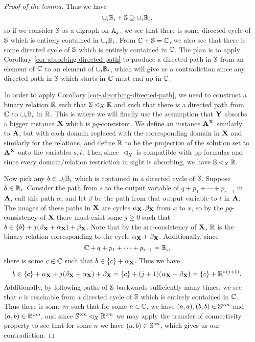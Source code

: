 \documentclass[letterpaper,11pt]{article}
\begin{document}
\begin{proof}[Proof of the lemma]
Thus we have
\[
\cup_i \mathbb{B}_i + \mathbb{S} \supseteq \cup_i\mathbb{B}_i,
\]
so if we consider $\mathbb{S}$ as a digraph on $\mathbb{A}_x$, we see that there is some directed cycle of $\mathbb{S}$ which is entirely contained in $\cup_i \mathbb{B}_i$. From $\mathbb{C} + \mathbb{S} = \mathbb{C}$, we also see that there is some directed cycle of $\mathbb{S}$ which is entirely contained in $\mathbb{C}$. The plan is to apply Corollary \ref{cor-absorbing-directed-path} to produce a directed path in $\mathbb{S}$ from an element of $\mathbb{C}$ to an element of $\cup_i \mathbb{B}_i$, which will give us a contradiction since any directed path in $\mathbb{S}$ which starts in $\mathbb{C}$ must end up in $\mathbb{C}$.

In order to apply Corollary \ref{cor-absorbing-directed-path}, we need to construct a binary relation $\mathbb{R}$ such that $\mathbb{S} \lhd_X \mathbb{R}$ and such that there is a directed path from $\mathbb{C}$ to $\cup_i \mathbb{B}_i$ in $\mathbb{R}$. This is where we will finally use the assumption that $\mathbf{Y}$ absorbs a bigger instance $\mathbf{X}$ which is $pq$-consistent. We define an instance $\mathbf{A}^{\mathbf{X}}$ similarly to $\mathbf{A}$, but with each domain replaced with the corresponding domain in $\mathbf{X}$ and similarly for the relations, and define $\mathbb{R}$ to be the projection of the solution set to $\mathbf{A}^{\mathbf{X}}$ onto the variables $s,t$. Then since $\lhd_X$ is compatible with pp-formulas and since every domain/relation restriction in sight is absorbing, we have $\mathbb{S} \lhd_X \mathbb{R}$.

Now pick any $b \in \cup_i \mathbb{B}_i$ which is contained in a directed cycle of $\mathbb{S}$. Suppose $b \in \mathbb{B}_i$. Consider the path from $s$ to the output variable of $q + p_1 + \cdots + p_{i-1}$ in $\mathbf{A}$, call this path $\alpha$, and let $\beta$ be the path from that output variable to $t$ in $\mathbf{A}$. The images of these paths in $\mathbf{X}$ are cycles $\alpha_{\mathbf{X}}, \beta_{\mathbf{X}}$ from $x$ to $x$, so by the $pq$-consistency of $\mathbf{X}$ there must exist some $j \ge 0$ such that $b \in \{b\} + j(\beta_{\mathbf{X}}+\alpha_{\mathbf{X}})+\beta_{\mathbf{X}}$. Note that by the arc-consistency of $\mathbf{X}$, $\mathbb{R}$ is the binary relation corresponding to the cycle $\alpha_{\mathbf{X}}+\beta_{\mathbf{X}}$. Additionally, since
\[
\mathbb{C} + q + p_1 + \cdots + p_{i-1} = \mathbb{B}_i,
\]
there is some $c \in \mathbb{C}$ such that $b \in \{c\} + \alpha_{\mathbf{X}}$. Thus we have
\[
b \in \{c\} + \alpha_{\mathbf{X}} + j(\beta_{\mathbf{X}} + \alpha_{\mathbf{X}}) + \beta_{\mathbf{X}} = \{c\} + (j+1)(\alpha_{\mathbf{X}} + \beta_{\mathbf{X}}) = \{c\} + \mathbb{R}^{\circ (j+1)}.
\]
Additionally, by following paths of $\mathbb{S}$ backwards sufficiently many times, we see that $c$ is reachable from a directed cycle of $\mathbb{S}$ which is entirely contained in $\mathbb{C}$. Thus there is some $m$ such that for some $a \in \mathbb{C}$, we have $(a,a), (b,b) \in \mathbb{S}^{\circ m}$ and $(a,b) \in \mathbb{R}^{\circ m}$, and since $\mathbb{S}^{\circ m} \lhd_X \mathbb{R}^{\circ m}$ we may apply the transfer of connectivity property to see that for some $n$ we have $(a,b) \in \mathbb{S}^{\circ n}$, which gives us our contradiction.
\end{proof}
\end{document}

